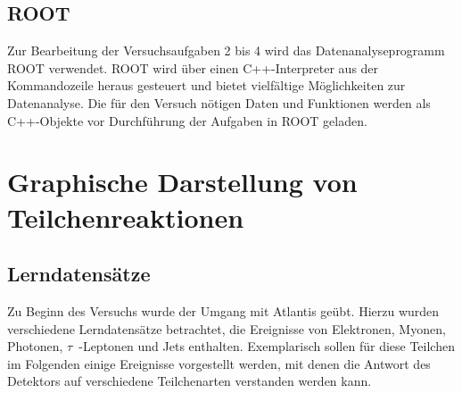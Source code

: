\documentclass[11pt, a4paper]{article}
\numberwithin{equation}{section}
\begin{document}
\subsection{ROOT}
Zur Bearbeitung der Versuchsaufgaben 2 bis 4 wird das Datenanalyseprogramm ROOT verwendet.
ROOT wird über einen C++-Interpreter aus der Kommandozeile heraus gesteuert und bietet vielfältige Möglichkeiten zur Datenanalyse.
Die für den Versuch nötigen Daten und Funktionen werden als C++-Objekte vor Durchführung der Aufgaben in ROOT geladen.


\section{Graphische Darstellung von Teilchenreaktionen}

\subsection{Lerndatensätze}

Zu Beginn des Versuchs wurde der Umgang mit Atlantis geübt.
Hierzu wurden verschiedene Lerndatensätze betrachtet, die Ereignisse von Elektronen, Myonen, Photonen, $\tau$~-Leptonen und Jets enthalten.
Exemplarisch sollen für diese Teilchen im Folgenden einige Ereignisse vorgestellt werden, mit denen die Antwort des Detektors auf verschiedene Teilchenarten verstanden werden kann.

\clearpage
\end{document}
